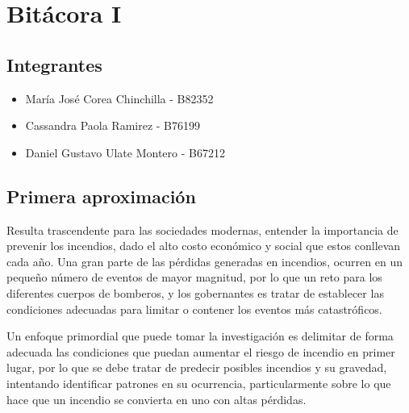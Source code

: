\documentclass[
  oneside]{memoir}
\begin{document}
\begin{titlingpage}
\begin{center}


 
  \end{center}

\end{titlingpage}


\mainmatter
\fancyhead[LE,RO]{\slshape \rightmark}
\fancyhead[LO,RE]{\slshape \leftmark}
\fancyfoot[C]{\thepage}

\tableofcontents*

\newpage
\chapter{Bitácora I}

\section{Integrantes}

\begin{itemize}
  \item María José Corea Chinchilla - B82352
  \item Cassandra Paola Ramirez - B76199
  \item Daniel Gustavo Ulate Montero - B67212
\end{itemize}

\section{Primera aproximación}

Resulta trascendente para las sociedades modernas, entender la
importancia de prevenir los incendios, dado el alto costo económico y
social que estos conllevan cada año. Una gran parte de las pérdidas
generadas en incendios, ocurren en un pequeño número de eventos de mayor
magnitud, por lo que un reto para los diferentes cuerpos de bomberos, y
los gobernantes es tratar de establecer las condiciones adecuadas para
limitar o contener los eventos más catastróficos.

Un enfoque primordial que puede tomar la investigación es delimitar de
forma adecuada las condiciones que puedan aumentar el riesgo de incendio
en primer lugar, por lo que se debe tratar de predecir posibles
incendios y su gravedad, intentando identificar patrones en su
ocurrencia, particularmente sobre lo que hace que un incendio se
convierta en uno con altas pérdidas.
\end{document}
